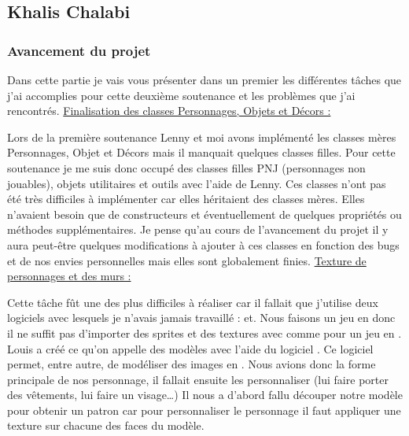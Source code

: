 \documentclass{article}
\begin{document}
\newpage

\subsection{Khalis Chalabi}

\subsubsection{Avancement du projet}

\par
Dans cette partie je vais vous présenter dans un premier les différentes tâches que j'ai accomplies pour cette deuxième  soutenance et les problèmes que j'ai rencontrés.
\newline
\newline
\underline{Finalisation des classes Personnages, Objets et Décors :}
\newline

\par
Lors de la première soutenance Lenny et moi avons implémenté les classes mères Personnages, Objet et Décors mais il manquait quelques classes filles. Pour cette soutenance je me suis donc occupé des classes filles PNJ (personnages non jouables), objets utilitaires et outils avec l’aide de Lenny. Ces classes n’ont pas été très difficiles à implémenter car elles héritaient des classes mères. Elles n’avaient besoin que de constructeurs et éventuellement de quelques propriétés ou méthodes supplémentaires. Je pense qu’au cours de l’avancement du projet il y aura peut-être quelques modifications à ajouter à ces classes en fonction des bugs et de nos envies personnelles mais elles sont globalement finies.
\newline
\newline
\underline{Texture de personnages et des murs :}
\newline

\par
Cette tâche fût une des plus difficiles à réaliser car il fallait que j’utilise deux logiciels avec lesquels je n’avais jamais travaillé : et. Nous faisons un jeu en  donc il ne suffit pas d’importer des sprites et des textures avec  comme pour un jeu en . Louis a créé ce qu’on appelle des modèles avec l’aide du logiciel . Ce logiciel permet, entre autre, de modéliser des images en . Nous avions donc la forme principale de nos personnage, il fallait ensuite les personnaliser (lui faire porter des vêtements, lui faire un visage…) Il nous a d’abord fallu découper notre modèle pour obtenir un patron car pour personnaliser le personnage il faut appliquer une texture sur chacune des faces du modèle.
\newline
\end{document}
